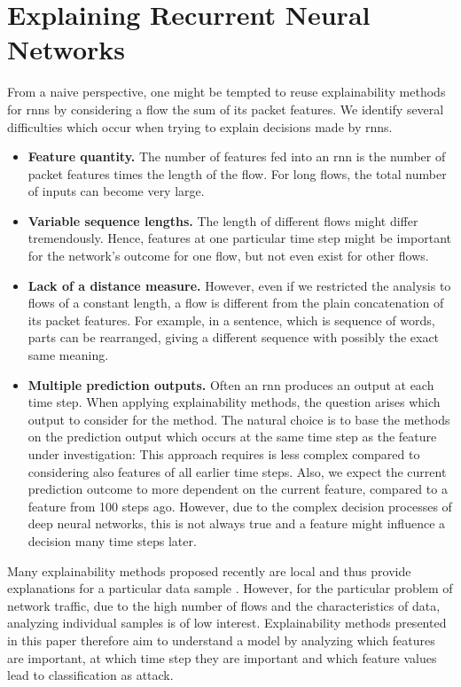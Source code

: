 \documentclass[conference]{IEEEtran}
\begin{document}
\section{Explaining Recurrent Neural Networks}
From a naive perspective, one might be tempted to reuse explainability methods for \glspl{rnn} by considering a flow the sum of its packet features.
We identify several difficulties which occur when trying to explain decisions made by \glspl{rnn}.

\begin{itemize}[topsep=0pt,wide,labelwidth=!,labelindent=0pt]
\item
\textbf{Feature quantity.}
The number of features fed into an \gls{rnn} is the number of packet features times the length of the flow. For long flows, the total number of inputs can become very large.

\item
\textbf{Variable sequence lengths.}
The length of different flows might differ tremendously. Hence, features at one particular time step might be important for the network's outcome for one flow, but not even exist for other flows. 

\item
\textbf{Lack of a distance measure.}
However, even if we restricted the analysis to flows of a constant length, a flow is different from the plain concatenation of its packet features.
For example, in a sentence, which is sequence of words, parts can be rearranged, giving a different sequence with possibly the exact same meaning. 

\item
\textbf{Multiple prediction outputs.}
Often an \gls{rnn} produces an output at each time step. When  applying explainability methods, the question arises which output to consider for the method. The natural choice is to base the methods on the prediction output which occurs at the same time step as the feature under investigation: This approach requires is less complex compared to considering also features of all earlier time steps. Also, we expect the current prediction outcome to more dependent on the current feature, compared to a feature from 100 steps ago. 
However, due to the complex decision processes of deep neural networks,
this is not always true and a feature might influence a decision many time steps later. 
\end{itemize}

Many explainability methods proposed recently are local and thus provide explanations for a particular data sample \cite{shapley_value_1953,lundberg_unified_2017,dhurandhar_model_2018,ribeiro_why_2016}. However, for the particular problem of network traffic, due to the high number of flows and the characteristics of data, analyzing individual samples is of low interest. Explainability methods presented in this paper therefore aim to understand a model by analyzing which features are important, at which time step they are important and which feature values lead to classification as attack.
\end{document}
